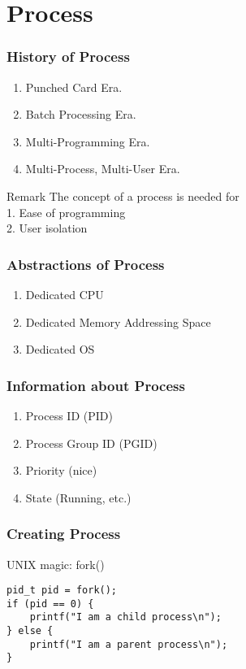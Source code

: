 \section[Process]{Process}

\begin{frame}
    \frametitle{History of Process}
    \begin{enumerate}
        \item Punched Card Era.
        \item Batch Processing Era.
        \item Multi-Programming Era.
        \item Multi-Process, Multi-User Era.
    \end{enumerate}

    \vspace{2em}

    \begin{alertblock}{Remark}
        The concept of a process is needed for \\
        1. Ease of programming \\
        2. User isolation
    \end{alertblock}
\end{frame}

\begin{frame}
    \frametitle{Abstractions of Process}
    \begin{enumerate}
        \item Dedicated CPU
        \item Dedicated Memory Addressing Space
        \item Dedicated OS
    \end{enumerate}
\end{frame}

\begin{frame}
    \frametitle{Information about Process}
    \begin{enumerate}
        \item Process ID (PID)
        \item Process Group ID (PGID)
        \item Priority (nice)
        \item State (Running, etc.)
    \end{enumerate}
\end{frame}

\begin{frame}[fragile]
    \frametitle{Creating Process}
    UNIX magic: fork()
    \begin{lstlisting}
pid_t pid = fork();
if (pid == 0) {
    printf("I am a child process\n");
} else {
    printf("I am a parent process\n");
}
    \end{lstlisting}
\end{frame}

